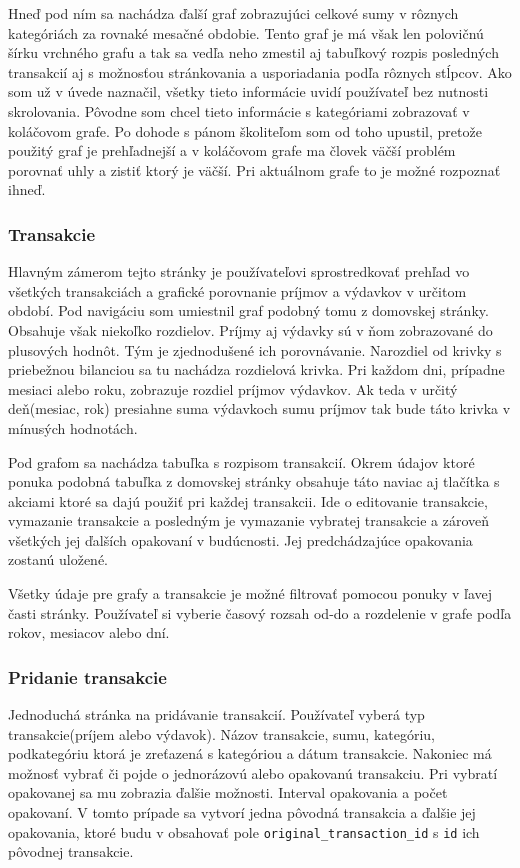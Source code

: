 \documentclass[12pt,oneside]{book}
\begin{document}
Hneď pod ním sa nachádza ďalší graf zobrazujúci celkové sumy v rôznych kategóriách za rovnaké mesačné obdobie. Tento graf je má však len polovičnú šírku vrchného grafu a tak sa vedľa neho zmestil aj tabuľkový rozpis posledných transakcií aj s možnosťou stránkovania a usporiadania podľa rôznych stĺpcov. Ako som už v úvede naznačil, všetky tieto informácie uvidí používateľ bez nutnosti skrolovania. Pôvodne som chcel tieto informácie s kategóriami zobrazovať v koláčovom grafe. Po dohode s pánom školiteľom som od toho upustil, pretože použitý graf je prehľadnejší a v koláčovom grafe ma človek väčší problém porovnať uhly a zistiť ktorý je väčší. Pri aktuálnom grafe to je možné rozpoznať ihneď.

\subsubsection{Transakcie}
Hlavným zámerom tejto stránky je používateľovi sprostredkovať prehľad vo všetkých transakciách a grafické porovnanie príjmov a výdavkov v určitom období. Pod navigáciu som umiestnil graf podobný tomu z domovskej stránky. Obsahuje však niekoľko rozdielov. Príjmy aj výdavky sú v ňom zobrazované do plusových hodnôt. Tým je zjednodušené ich porovnávanie. Narozdiel od krivky s priebežnou bilanciou sa tu nachádza rozdielová krivka. Pri každom dni, prípadne mesiaci alebo roku, zobrazuje rozdiel príjmov výdavkov. Ak teda v určitý deň(mesiac, rok) presiahne suma výdavkoch sumu príjmov tak bude táto krivka v mínusých hodnotách. 

Pod grafom sa nachádza tabuľka s rozpisom transakcií. Okrem údajov ktoré ponuka podobná tabuľka z domovskej stránky obsahuje táto naviac aj tlačítka s akciami ktoré sa dajú použiť pri každej transakcii. Ide o editovanie transakcie, vymazanie transakcie a posledným je vymazanie vybratej transakcie a zároveň všetkých jej ďalších opakovaní  v budúcnosti. Jej predchádzajúce opakovania zostanú uložené.

Všetky údaje pre grafy a transakcie je možné filtrovať pomocou ponuky v ľavej časti stránky. Používateľ si vyberie časový rozsah od-do a rozdelenie v grafe podľa rokov, mesiacov alebo dní.

\subsubsection{Pridanie transakcie}
Jednoduchá stránka na pridávanie transakcií. Používateľ vyberá typ transakcie(príjem alebo výdavok). Názov transakcie, sumu, kategóriu, podkategóriu ktorá je zreťazená s kategóriou a dátum transakcie. Nakoniec má možnosť vybrať či pojde o jednorázovú alebo opakovanú transakciu. Pri vybratí opakovanej sa mu zobrazia ďalšie možnosti. Interval opakovania a počet opakovaní. V tomto prípade sa vytvorí jedna pôvodná transakcia a ďalšie jej opakovania, ktoré budu v obsahovať pole \texttt{original\_transaction\_id} s \texttt{id} ich pôvodnej transakcie.
\end{document}
